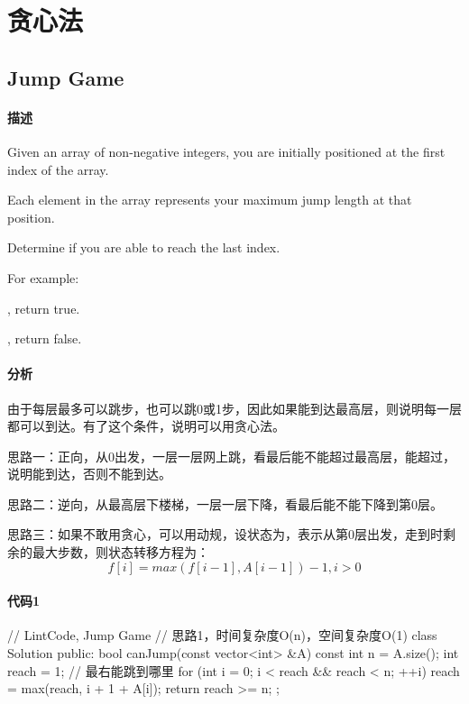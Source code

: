 \chapter{贪心法}


\section{Jump Game} %
\label{sec:jump-game}


\subsubsection{描述}
Given an array of non-negative integers, you are initially positioned at the first index of the array.

Each element in the array represents your maximum jump length at that position.

Determine if you are able to reach the last index.

For example:

, return true.

, return false.


\subsubsection{分析}
由于每层最多可以跳步，也可以跳0或1步，因此如果能到达最高层，则说明每一层都可以到达。有了这个条件，说明可以用贪心法。

思路一：正向，从0出发，一层一层网上跳，看最后能不能超过最高层，能超过，说明能到达，否则不能到达。

思路二：逆向，从最高层下楼梯，一层一层下降，看最后能不能下降到第0层。

思路三：如果不敢用贪心，可以用动规，设状态为，表示从第0层出发，走到时剩余的最大步数，则状态转移方程为：
$$
f[i] = max(f[i-1], A[i-1])-1, i > 0
$$


\subsubsection{代码1}
\begin{Code}
// LintCode, Jump Game
// 思路1，时间复杂度O(n)，空间复杂度O(1)
class Solution {
public:
    bool canJump(const vector<int> &A) {
        const int n = A.size();
        int reach = 1; // 最右能跳到哪里
        for (int i = 0; i < reach && reach < n; ++i)
            reach = max(reach,  i + 1 + A[i]);
        return reach >= n;
    }
};
\end{Code}


